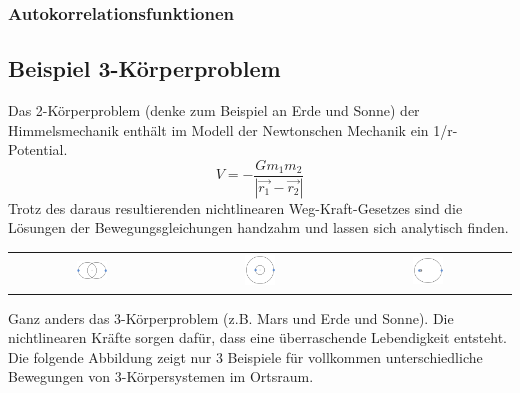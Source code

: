 \documentclass[12pt]{book}
\begin{document}
 

\subsubsection{Autokorrelationsfunktionen}


\subsection{Beispiel 3-Körperproblem}

Das 2-Körperproblem (denke zum Beispiel an Erde und Sonne) der Himmelsmechanik enthält im Modell der Newtonschen Mechanik ein 1/r-Potential.
\begin{equation*}
V = - \frac{G m_1 m_2}{|\vec{r_1} - \vec{r_2}|}
\end{equation*}
Trotz des daraus resultierenden nichtlinearen Weg-Kraft-Gesetzes sind die Lösungen der Bewegungsgleichungen handzahm und lassen sich analytisch finden.

\begin{center}
\begin{tabular}{c c c}
\includegraphics[width=0.2\textwidth]{Bilder/Binary_system_orbit_q=1_e=0dot5.png}
&
\includegraphics[width=0.2\textwidth]{Bilder/Binary_system_orbit_q=3_e=0.png}
&
\includegraphics[width=0.2\textwidth]{Bilder/Binary_system_orbit_q=10_e=0dot5.png}
\end{tabular}
\end{center}

Ganz anders das 3-Körperproblem (z.B. Mars und Erde und Sonne). Die nichtlinearen Kräfte sorgen dafür, dass eine überraschende Lebendigkeit entsteht. Die folgende Abbildung zeigt nur 3 Beispiele für vollkommen unterschiedliche Bewegungen von 3-Körpersystemen im Ortsraum.
\end{document}
